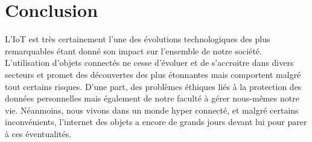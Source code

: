 \section*{Conclusion}
L’IoT est très certainement l’une des évolutions technologiques des plus remarquables étant donné son impact sur l’ensemble de notre société. L’utilisation d’objets connectés ne cesse d’évoluer et de s’accroitre dans divers secteurs et promet des découvertes des plus étonnantes mais comportent malgré tout certains risques. D’une part, des problèmes éthiques liés à la protection des données personnelles mais également de notre faculté à gérer nous-mêmes notre vie. Néanmoins, nous vivons dans un monde hyper connecté, et malgré certains inconvénients, l’internet des objets a encore de grands jours devant lui pour parer à ces éventualités.